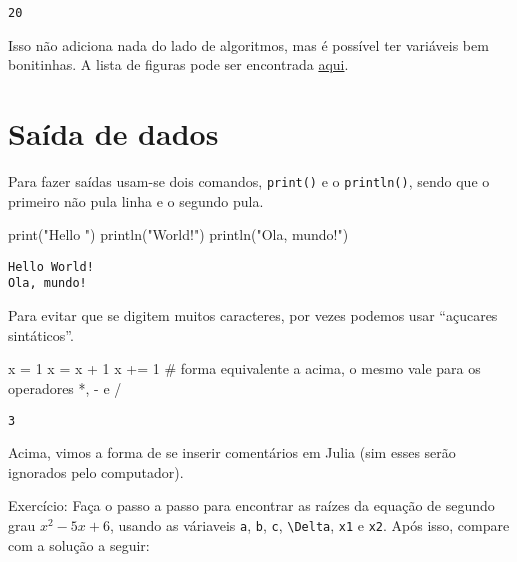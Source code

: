 \documentclass[
  letterpaper,
  DIV=11,
  numbers=noendperiod]{scrreprt}
\newenvironment{Shaded}{\begin{snugshade}}{\end{snugshade}}
\newcommand{\CommentTok}[1]{\textcolor[rgb]{0.37,0.37,0.37}{#1}}
\newcommand{\FloatTok}[1]{\textcolor[rgb]{0.68,0.00,0.00}{#1}}
\newcommand{\FunctionTok}[1]{\textcolor[rgb]{0.28,0.35,0.67}{#1}}
\newcommand{\NormalTok}[1]{\textcolor[rgb]{0.00,0.23,0.31}{#1}}
\newcommand{\OperatorTok}[1]{\textcolor[rgb]{0.37,0.37,0.37}{#1}}
\newcommand{\StringTok}[1]{\textcolor[rgb]{0.13,0.47,0.30}{#1}}
\begin{document}
\begin{verbatim}
20
\end{verbatim}

Isso não adiciona nada do lado de algoritmos, mas é possível ter
variáveis bem bonitinhas. A lista de figuras pode ser encontrada
\href{://docs.julialang.org/en/v1/manual/unicode-input/}{aqui}.

\section{Saída de dados}\label{sauxedda-de-dados}

Para fazer saídas usam-se dois comandos, \texttt{print()} e o
\texttt{println()}, sendo que o primeiro não pula linha e o segundo
pula.

\begin{Shaded}
\begin{Highlighting}[]
\FunctionTok{print}\NormalTok{(}\StringTok{"Hello "}\NormalTok{)}
\FunctionTok{println}\NormalTok{(}\StringTok{"World!"}\NormalTok{)}
\FunctionTok{println}\NormalTok{(}\StringTok{"Ola, mundo!"}\NormalTok{)}
\end{Highlighting}
\end{Shaded}

\begin{verbatim}
Hello World!
Ola, mundo!
\end{verbatim}

Para evitar que se digitem muitos caracteres, por vezes podemos usar
``açucares sintáticos''.

\begin{Shaded}
\begin{Highlighting}[]
\NormalTok{x }\OperatorTok{=} \FloatTok{1}
\NormalTok{x }\OperatorTok{=}\NormalTok{ x }\OperatorTok{+} \FloatTok{1}
\NormalTok{x }\OperatorTok{+=} \FloatTok{1}  \CommentTok{\# forma equivalente a acima, o mesmo vale para os operadores *, {-} e /}
\end{Highlighting}
\end{Shaded}

\begin{verbatim}
3
\end{verbatim}

Acima, vimos a forma de se inserir comentários em Julia (sim esses serão
ignorados pelo computador).

Exercício: Faça o passo a passo para encontrar as raízes da equação de
segundo grau \(x^2 - 5 x + 6\), usando as váriaveis \texttt{a},
\texttt{b}, \texttt{c}, \texttt{\textbackslash{}Delta}, \texttt{x1} e
\texttt{x2}. Após isso, compare com a solução a seguir:
\end{document}
